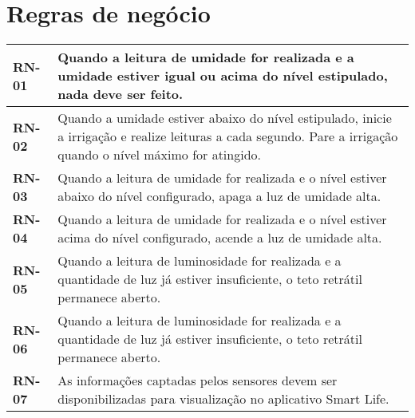     \section{Regras de negócio}
        \begin{table}[!htbp]
            \centering
            \renewcommand{\arraystretch}{1.3}
            \label{tab:quadro_regras_negocio}
            \begin{tabular}{| L{3cm} | L{11cm} | }
                \hline
                \textbf{RN-01} & Quando a leitura de umidade for realizada e a umidade estiver igual ou acima do
                nível estipulado, nada deve ser feito.\\
                \hline

                \hline
                \textbf{RN-02} & Quando a umidade estiver abaixo do nível estipulado, inicie a irrigação e realize leituras
                a cada segundo. Pare a irrigação quando o nível máximo for atingido.\\
                \hline

                \hline
                \textbf{RN-03} & Quando a leitura de umidade for realizada e o nível estiver abaixo do nível
                configurado, apaga a luz de umidade alta.\\
                \hline

                \hline
                \textbf{RN-04} & Quando a leitura de umidade for realizada e o nível estiver acima do nível
                configurado, acende a luz de umidade alta.\\
                \hline

                \hline
                \textbf{RN-05} & Quando a leitura de luminosidade for realizada e a quantidade de luz já estiver
                insuficiente, o teto retrátil permanece aberto.\\
                \hline

                \hline
                \textbf{RN-06} & Quando a leitura de luminosidade for realizada e a quantidade de luz já estiver
                insuficiente, o teto retrátil permanece aberto.\\
                \hline

                \hline
                \textbf{RN-07} & As informações captadas pelos sensores devem ser disponibilizadas para visualização
                no aplicativo Smart Life.\\
                \hline

            \end{tabular}
            \vspace{2mm}
        \end{table}

